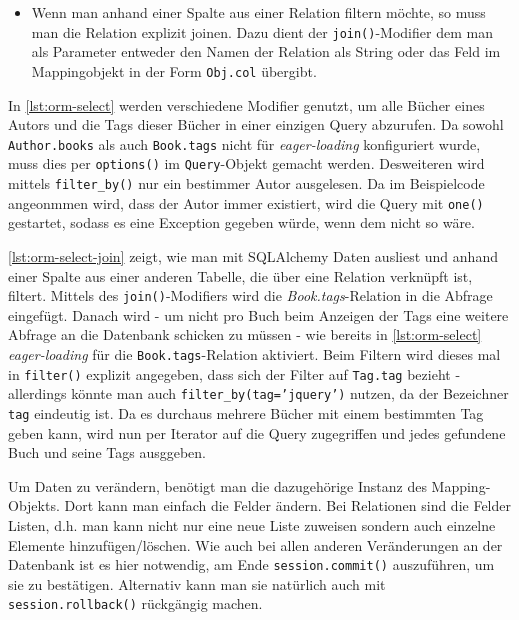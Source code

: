 \begin{itemize}
\item Wenn man anhand einer Spalte aus einer Relation filtern möchte, so muss
man die Relation explizit joinen. Dazu dient der \texttt{join()}-Modifier dem
man als Parameter entweder den Namen der Relation als String oder das Feld im
Mappingobjekt in der Form \texttt{Obj.col} übergibt.

\end{itemize}

In \autoref{lst:orm-select} werden verschiedene Modifier genutzt, um alle Bücher
eines Autors und die Tags dieser Bücher in einer einzigen Query abzurufen. Da
sowohl \texttt{Author.books} als auch \texttt{Book.tags} nicht für
\emph{eager-loading} konfiguriert wurde, muss dies per \texttt{options()} im
\texttt{Query}-Objekt gemacht werden. Desweiteren wird mittels
\texttt{filter\_by()} nur ein bestimmer Autor ausgelesen. Da im Beispielcode
angeonmmen wird, dass der Autor immer existiert, wird die Query mit
\texttt{one()} gestartet, sodass es eine Exception gegeben würde, wenn dem nicht
so wäre.



\autoref{lst:orm-select-join} zeigt, wie man mit SQLAlchemy Daten ausliest und
anhand einer Spalte aus einer anderen Tabelle, die über eine Relation verknüpft
ist, filtert. Mittels des \texttt{join()}-Modifiers wird die
\emph{Book.tags}-Relation in die Abfrage eingefügt. Danach wird - um nicht pro
Buch beim Anzeigen der Tags eine weitere Abfrage an die Datenbank schicken zu
müssen - wie bereits in \autoref{lst:orm-select} \emph{eager-loading} für die
\texttt{Book.tags}-Relation aktiviert. Beim Filtern wird dieses mal in
\texttt{filter()} explizit angegeben, dass sich der Filter auf \texttt{Tag.tag}
bezieht - allerdings könnte man auch \texttt{filter\_by(tag='jquery')} nutzen,
da der Bezeichner \texttt{tag} eindeutig ist. Da es durchaus mehrere Bücher mit
einem bestimmten Tag geben kann, wird nun per Iterator auf die Query zugegriffen
und jedes gefundene Buch und seine Tags ausggeben.



Um Daten zu verändern, benötigt man die dazugehörige Instanz des
Mapping-Objekts. Dort kann man einfach die Felder ändern. Bei Relationen sind
die Felder Listen, d.h. man kann nicht nur eine neue Liste zuweisen sondern auch
einzelne Elemente hinzufügen/löschen. Wie auch bei allen anderen Veränderungen
an der Datenbank ist es hier notwendig, am Ende \texttt{session.commit()}
auszuführen, um sie zu bestätigen. Alternativ kann man sie natürlich auch mit
\texttt{session.rollback()} rückgängig machen.

